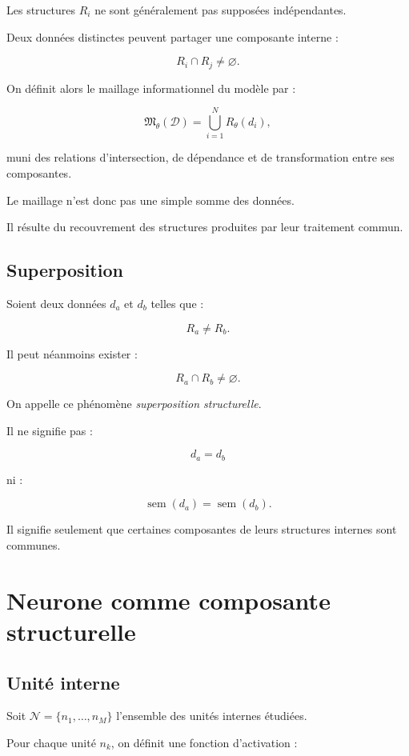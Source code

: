 \documentclass[11pt,a4paper]{article}
\newcommand{\D}{\mathcal D}
\begin{document}
Les structures $R_i$ ne sont généralement pas supposées indépendantes.

Deux données distinctes peuvent partager une composante interne :

\[
R_i\cap R_j\neq\varnothing.
\]

On définit alors le maillage informationnel du modèle par :

\[
\boxed{
\mathfrak M_\theta(\D)
=
\bigcup_{i=1}^{N}R_\theta(d_i),
}
\]

muni des relations d'intersection, de dépendance et de transformation
entre ses composantes.

Le maillage n'est donc pas une simple somme des données.

Il résulte du recouvrement des structures produites par leur traitement
commun.

\subsection{Superposition}

Soient deux données $d_a$ et $d_b$ telles que :

\[
R_a\neq R_b.
\]

Il peut néanmoins exister :

\[
R_a\cap R_b\neq\varnothing.
\]

On appelle ce phénomène \emph{superposition structurelle}.

Il ne signifie pas :

\[
d_a=d_b
\]

ni :

\[
\operatorname{sem}(d_a)=\operatorname{sem}(d_b).
\]

Il signifie seulement que certaines composantes de leurs structures
internes sont communes.

\section{Neurone comme composante structurelle}

\subsection{Unité interne}

Soit $\mathcal N=\{n_1,\ldots,n_M\}$ l'ensemble des unités internes étudiées.

Pour chaque unité $n_k$, on définit une fonction d'activation :
\end{document}
